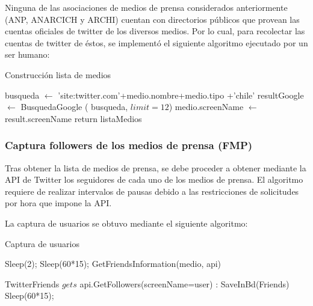 Ninguna de las asociaciones de medios de prensa considerados anteriormente (ANP, ANARCICH y ARCHI) cuentan con directorios públicos \cite{mediosArchi} \cite{mediosaAnp} \cite{mediosAnarcich} que provean las cuentas oficiales de twitter de los diversos medios. Por lo cual, para recolectar las cuentas de twitter de éstos, se implementó el siguiente algoritmo ejecutado por un ser humano:


\begin{algorithm}[H]
	\caption{Construcción lista de medios}\label{mediosPrensa}
	\begin{algorithmic}[1]
		\State busqueda $\gets$ 'site:twitter.com'+medio.nombre+medio.tipo +'chile'
		\State resultGoogle $\gets$ BusquedaGoogle ( busqueda, $limit=12$)
		\State medio.screenName $\gets$ result.screenName
		\EndIf 
		\EndFor
		\EndFor
		\State return listaMedios
		\EndFunction	
	\end{algorithmic}
\end{algorithm}

\subsubsection{Captura followers de los medios de prensa (FMP)}

Tras obtener la lista de medios de prensa, se debe proceder a obtener mediante la API de Twitter los seguidores de cada uno de los medios de prensa. El algoritmo requiere de realizar intervalos de pausas debido a las restricciones de solicitudes por hora que impone la API.

La captura de usuarios se obtuvo mediante el siguiente algoritmo:

\begin{algorithm}[H]
	\caption{Captura de usuarios}\label{capturaUsuarios}
	\begin{algorithmic}[1]
		\State Sleep(2);
		\Else
		\State Sleep(60*15);
		\State GetFriendsInformation(medio, api)
		\EndIf
		\EndFor
		\EndFunction
		
		\State TwitterFriends $gets$ api.GetFollowers(screenName=user)
		:
		\State SaveInBd(Friends)
		\EndFor
		\Else
		\State Sleep(60*15);
		\EndIf
		\EndFunction
		
	\end{algorithmic}
\end{algorithm}

